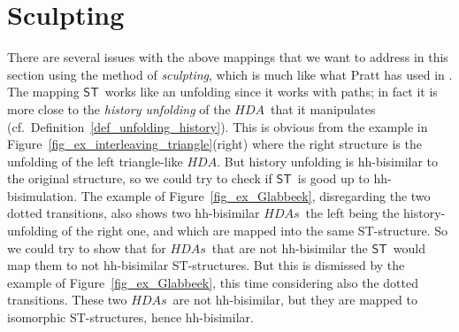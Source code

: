 \documentclass[submission,copyright,creativecommons]{eptcs}
\newcommand{\cp}[1]{}
\newcommand\HDA{\ensuremath{\mathit{HDA}}}
\newcommand\HDAs{\ensuremath{\mathit{HDAs}}}
\newcommand\allHDA{\ensuremath{\mathbb{HDA}}}
\newcommand\hintost{\ensuremath{\mathsf{ST}}}
\newcommand\categoryHDA{\ensuremath{\allHDA}}
\begin{document}
\cp{What is the category of sculptures? And what is its relation with the category of \HDAs?
Sculptures are special morphisms (together with their respective objects) from the category of \HDAs. If we take such morphisms as objects, then what are the morphisms between sculptures?

Note that a bulk is a sculpture wrt.\ all other bulks of higher dimension. So there are many such morphism with the origin in a bulk. We are interested only in those sculpture morphisms which are \textit{simplistic}. What is their categorical characterization in the category \categoryHDA?
}


\section{Sculpting}\label{subsec_sculpting}

There are several issues with the above mappings that we want to address in this section using the method of \textit{sculpting}, which is much like what Pratt has used in \cite{Pratt96reconcilingevent,Pratt00HDArev}.
The mapping \hintost\ works like an unfolding since it works with paths; in fact it is more close to the \textit{history unfolding} of the \HDA\ that it manipulates (cf.\ Definition~\ref{def_unfolding_history}). This is obvious from the example in Figure~\ref{fig_ex_interleaving_triangle}(right) where the right structure is the unfolding of the left triangle-like \HDA. But history unfolding is hh-bisimilar to the original structure, so we could try to check if \hintost\ is good up to hh-bisimulation. The example of Figure~\ref{fig_ex_Glabbeek}, disregarding the two dotted transitions, also shows two hh-bisimilar \HDAs\ the left being the history-unfolding of the right one, and which are mapped into the same ST-structure. So we could try to show that for \HDAs\ that are not hh-bisimilar the \hintost\ would map them to not hh-bisimilar ST-structures. But this is dismissed by the example of Figure~\ref{fig_ex_Glabbeek}, this time considering also the dotted transitions. These two \HDAs\ are not hh-bisimilar, but they are mapped to isomorphic ST-structures, hence hh-bisimilar.
\end{document}
